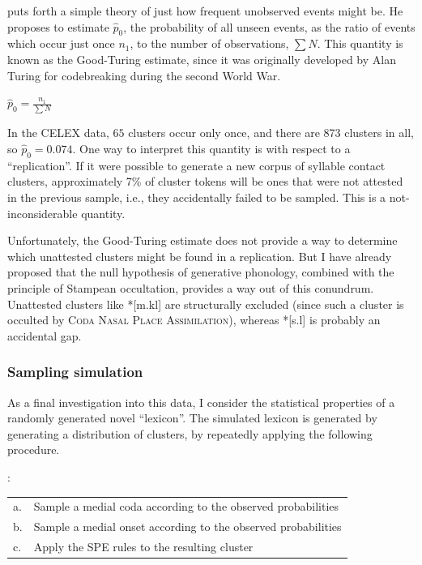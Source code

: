 \citet{Good1953} puts forth a simple theory of just how frequent unobserved events might be. He proposes to estimate $\hat{p}_0$, the probability of all unseen events, as the ratio of events which occur just once $n_1$, to the number of observations, $\sum N$. This quantity is known as the Good-Turing estimate, since it was originally developed by Alan Turing for codebreaking during the second World War.

\ex $\displaystyle \hat{p}_0 = \frac{n_1}{\sum N}$ \xe

\noindent
In the CELEX data, $65$ clusters occur only once, and there are 873 clusters in all, so $\hat{p}_0 = 0.074$. One way to interpret this quantity is with respect to a ``replication''. If it were possible to generate a new corpus of syllable contact clusters, approximately 7\% of cluster tokens will be ones that were not attested in the previous sample, i.e., they accidentally failed to be sampled. This is a not-inconsiderable quantity. 

Unfortunately, the Good-Turing estimate does not provide a way to determine which unattested clusters might be found in a replication. But I have already proposed that the null hypothesis of generative phonology, combined with the principle of Stampean occultation, provides a way out of this conundrum. Unattested clusters like *[m.kl] are structurally excluded (since such a cluster is occulted by \textsc{Coda Nasal Place Assimilation}), whereas *[s.l] is probably an accidental gap.

\subsubsection{Sampling simulation}

As a final investigation into this data, I consider the statistical properties of a randomly generated novel ``lexicon''. The simulated lexicon is generated by  generating a distribution of clusters, by repeatedly applying the following procedure.

: \\
    \begin{tabular}{l l}
    a. & Sample a medial coda according to the observed probabilities  \\
    b. & Sample a medial onset according to the observed probabilities \\
    c. & Apply the SPE rules to the resulting cluster                  \\
    \end{tabular}
\xe

